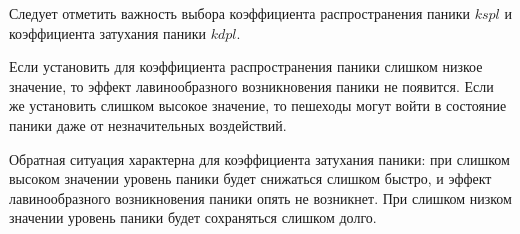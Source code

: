 Следует отметить важность выбора коэффициента распространения паники $kspl$ и коэффициента затухания паники $kdpl$.

Если установить для коэффициента распространения паники слишком низкое значение, то эффект лавинообразного возникновения паники не появится.
Если же установить слишком высокое значение, то пешеходы могут войти в состояние паники даже от незначительных воздействий.

Обратная ситуация характерна для коэффициента затухания паники:
при слишком высоком значении уровень паники будет снижаться слишком быстро,
и эффект лавинообразного возникновения паники опять не возникнет.
При слишком низком значении уровень паники будет сохраняться слишком долго.

